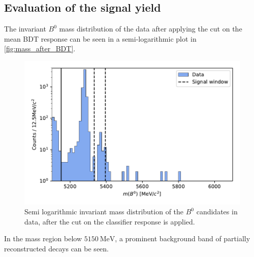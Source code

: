 \subsection{Evaluation of the signal yield}
The invariant $B^0$ mass distribution of the data after applying the cut on the mean BDT response can be seen in a semi-logarithmic plot in \autoref{fig:mass_after_BDT}.
\begin{figure}
  \centering
  \includegraphics[width = .8\textwidth]{"content/plots/mass_after_BDT.pdf"}
  \caption{Semi logarithmic invariant mass distribution of the $B^0$ candidates in data, after the cut on the classifier response is applied.}
  \label{fig:mass_after_BDT}
\end{figure}
In the mass region below $\qty{5150}{\mega\eV}$, a prominent background band of partially reconstructed decays can be seen.

